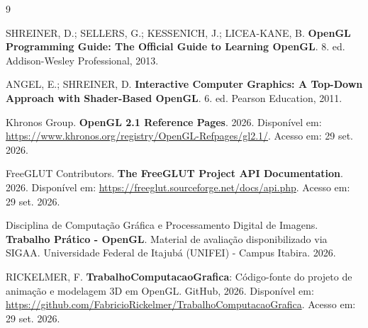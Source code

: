 \documentclass[conference]{IEEEtran}
\begin{document}
\begin{thebibliography}{9}
	
	SHREINER, D.; SELLERS, G.; KESSENICH, J.; LICEA-KANE, B. \textbf{OpenGL Programming Guide: The Official Guide to Learning OpenGL}. 8. ed. Addison-Wesley Professional, 2013.
	
	ANGEL, E.; SHREINER, D. \textbf{Interactive Computer Graphics: A Top-Down Approach with Shader-Based OpenGL}. 6. ed. Pearson Education, 2011.
	
	Khronos Group. \textbf{OpenGL 2.1 Reference Pages}. 2026. Disponível em: \url{https://www.khronos.org/registry/OpenGL-Refpages/gl2.1/}. Acesso em: 29 set. 2026.
	
	FreeGLUT Contributors. \textbf{The FreeGLUT Project API Documentation}. 2026. Disponível em: \url{https://freeglut.sourceforge.net/docs/api.php}. Acesso em: 29 set. 2026.
	
	Disciplina de Computação Gráfica e Processamento Digital de Imagens. \textbf{Trabalho Prático - OpenGL}. Material de avaliação disponibilizado via SIGAA. Universidade Federal de Itajubá (UNIFEI) - Campus Itabira. 2026.
	
	RICKELMER, F. \textbf{TrabalhoComputacaoGrafica}: Código-fonte do projeto de animação e modelagem 3D em OpenGL. GitHub, 2026. Disponível em: \url{https://github.com/FabricioRickelmer/TrabalhoComputacaoGrafica}. Acesso em: 29 set. 2026.
	
\end{thebibliography}
\end{document}

